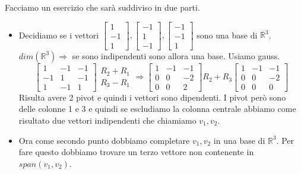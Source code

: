 \newpage
\begin{example}
Facciamo un esercizio che sarà suddiviso in due parti.
\begin{itemize}
    \item Decidiamo se i vettori $\begin{bmatrix}1\\-1\\1\end{bmatrix}, \begin{bmatrix}-1\\1\\-1\end{bmatrix}, \begin{bmatrix}-1\\-1\\1\end{bmatrix}$ sono una base di $\mathbb{R}^3$. $dim(\mathbb{R}^3) \Longrightarrow$ se sono indipendenti sono allora una base. Usiamo gauss.
    \[
    \begin{bmatrix}
    1 & -1 & -1\\
    -1 & 1 & -1 \\
    1 & -1 & 1
    \end{bmatrix}
    \begin{array}{l}
        R_2 + R_1\\
        R_3 - R_1
    \end{array}
    \Rightarrow
    \begin{bmatrix}
    1 & -1 & -1\\
    0 & 0 & -2 \\
    0 & 0 & 2
    \end{bmatrix}
    R_2 + R_3
    \begin{bmatrix}
    1 & -1 & -1\\
    0 & 0 & -2 \\
    0 & 0 & 0
    \end{bmatrix}
    \]
    Risulta avere 2 pivot e quindi i vettori sono dipendenti. I pivot però sono delle colonne 1 e 3 e quindi se escludiamo la colonna centrale abbiamo come risultato due vettori indipendenti che chiamiamo $v_1, v_2$.
    \item Ora come secondo punto dobbiamo completare $v_1, v_2$ in una base di $\mathbb{R}^3$. Per fare questo dobbiamo trovare un terzo vettore non contenente in $span(v_1, v_2)$.\\

\end{itemize}
\end{example}
